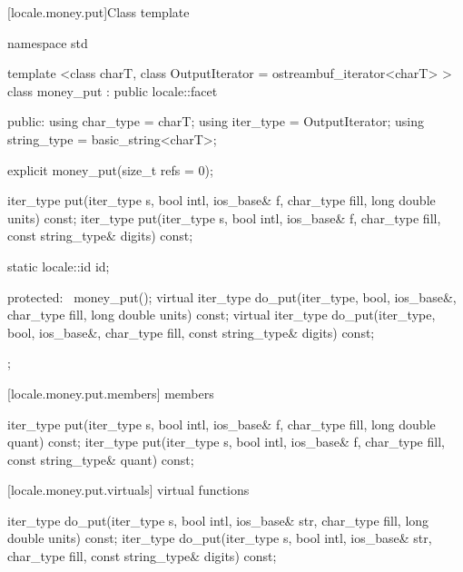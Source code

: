 [locale.money.put]{Class template }

%
\begin{codeblock}
namespace std {
  template <class charT,
    class OutputIterator = ostreambuf_iterator<charT> >
  class money_put : public locale::facet {
  public:
    using char_type   = charT;
    using iter_type   = OutputIterator;
    using string_type = basic_string<charT>;

    explicit money_put(size_t refs = 0);

    iter_type put(iter_type s, bool intl, ios_base& f,
                  char_type fill, long double units) const;
    iter_type put(iter_type s, bool intl, ios_base& f,
                  char_type fill, const string_type& digits) const;

    static locale::id id;

  protected:
    ~money_put();
    virtual iter_type do_put(iter_type, bool, ios_base&, char_type fill,
                             long double units) const;
    virtual iter_type do_put(iter_type, bool, ios_base&, char_type fill,
                             const string_type& digits) const;
  };
}
\end{codeblock}

[locale.money.put.members]{ members}

%
%
\begin{itemdecl}
iter_type put(iter_type s, bool intl, ios_base& f, char_type fill,
              long double quant) const;
iter_type put(iter_type s, bool intl, ios_base& f, char_type fill,
              const string_type& quant) const;
\end{itemdecl}

\begin{itemdescr}
\pnum
\returns
{}
\end{itemdescr}

[locale.money.put.virtuals]{ virtual functions}

%
%
\begin{itemdecl}
iter_type do_put(iter_type s, bool intl, ios_base& str,
                 char_type fill, long double units) const;
iter_type do_put(iter_type s, bool intl, ios_base& str,
                 char_type fill, const string_type& digits) const;
\end{itemdecl}

